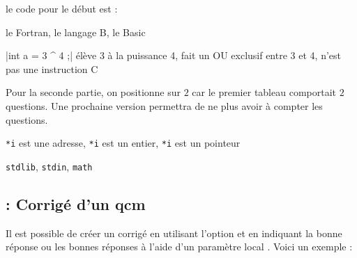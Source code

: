 le code pour le début est :

\begin{tkzltxexample}[small]
  \begin{alterqcm}[lq=80mm,title=false,num=false,long] 
  {{le Fortran},
   {le langage B},
   {le Basic}}

  \verbdef\argprop|int a = 3 ^ 4 ;|
  \AQquestion{\argprop}
  {{élève 3 à la puissance 4},
   {fait un OU exclusif entre 3 et 4},
   {n'est pas une instruction C}}
  \end{alterqcm}
\end{tkzltxexample}

Pour la seconde partie, on positionne  sur $2$ car le premier
 tableau comportait $2$ questions. Une prochaine version permettra de ne plus avoir à compter
  les questions.

\begin{tkzltxexample}[small]
  \begin{alterqcm}[lq=80mm,title=false,num=false,numbreak=2,long] 
  {{\texttt{*i} est une adresse},
   {\texttt{*i} est un entier},
   {\texttt{*i} est un pointeur}}

  {{\texttt{stdlib}},
   {\texttt{stdin}},
   {\texttt{math}}}
  \end{alterqcm}
\end{tkzltxexample}   

\newpage
\subsection{ : Corrigé d'un qcm} 
 
 Il est possible de créer un corrigé en utilisant l'option  et en indiquant la bonne réponse ou les bonnes réponses à l'aide d'un paramètre local . 
 Voici un exemple :
 
 \begin{alterqcm}[VF,lq=125mm,correction,
                  symb    = \dingsquare,
                  corsymb = \dingchecksquare]
 \AQquestion[br=1]{Pour tout $x \in ]-3~;~2],~f'(x) \geqslant 0$.}
 \end{alterqcm}
 
